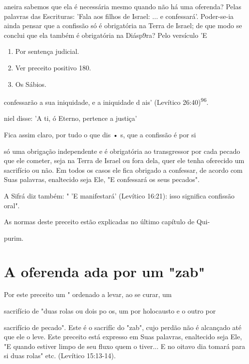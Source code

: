 \begin{itemize}
\begin{enumrate}
\begin{itemize}
\begin{itemize}
aneira sabemos que ela é necessária mesmo quando não há uma oferen­da?
Pelas palavras das Escrituras: 'Fala aos filhos de Israel: ... e
confessará'. Poder-se-ia ainda pensar que a confissão só é obrigatória
na Terra de Israel; de que modo se conclui que ela também é obrigatória
na Diásp9ra? Pelo versículo 'E


\begin{enumerate}
\def\labelenumi{\arabic{enumi}.}
\setcounter{enumi}{92}
\item
 
 Por sentença judicial.
 
\item
 
 Ver preceito positivo 180.
 
\item
 
 Os Sábios.
 
\end{enumerate}

confessarão a sua iniquidade, e a iniquidade d ais' (Levítico
26:40)\textsuperscript{96}.

niel disse: 'A ti, ó Eterno, pertence a justiça'

Fica assim claro, por tudo o que dis • s, que a confissão é por si

só uma obrigação independente e é obrigatória ao transgressor por cada
peca­do que ele cometer, seja na Terra de Israel ou fora dela, quer ele
tenha ofereci­do um sacrifício ou não. Em todos os casos ele fica
obrigado a confessar, de acordo com Suas palavras, enaltecido seja Ele,
"E confessará os seus pecados".

A Sifrá diz também: " 'E manifestará' (Levítico 16:21): isso significa
confissão oral".


As normas deste preceito estão explicadas no último capítulo de Qui-


purim.


\section{A oferenda ada por um "zab"}


Por este preceito um " ordenado a levar, ao se curar, um

sacrifício de "duas rolas ou dois po os, um por holocausto e o outro por

sacrifício de pecado". Este é o sacrifíc do "zab", cujo perdão não é
alcança­do até que ele o leve. Este preceito está expresso em Suas
palavras, enaltecido seja Ele, "E quando estiver limpo de seu fluxo quem
o tiver... E no oitavo dia tomará para si duas rolas" etc. (Levítico
15:13-14).


\end{itemize}
\end{itemize}
\end{enumrate}
\end{itemize}
